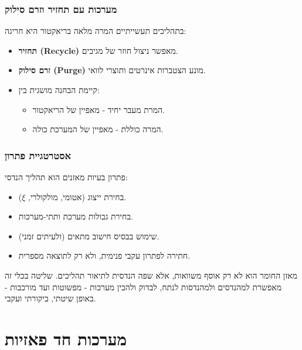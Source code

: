 \documentclass[
  hebrew,
  letterpaper,
  DIV=11,
  numbers=noendperiod]{scrreprt}
\providecommand{\tightlist}{%
  \setlength{\itemsep}{0pt}\setlength{\parskip}{0pt}}
\begin{document}
\subsection{מערכות עם תחזיר וזרם
סילוק}\label{ux5deux5e2ux5e8ux5dbux5d5ux5ea-ux5e2ux5dd-ux5eaux5d7ux5d6ux5d9ux5e8-ux5d5ux5d6ux5e8ux5dd-ux5e1ux5d9ux5dcux5d5ux5e7}

בתהליכים תעשייתיים המרה מלאה בריאקטור היא חריגה:

\begin{itemize}
\tightlist
\item
  \textbf{תחזיר (Recycle)} מאפשר ניצול חוזר של מגיבים.
\item
  \textbf{זרם סילוק (Purge)} מונע הצטברות אינרטים ותוצרי לוואי.
\item
  קיימת הבחנה מושגית בין:

  \begin{itemize}
  \tightlist
  \item
    המרת מעבר יחיד - מאפיין של הריאקטור.
  \item
    המרה כוללת - מאפיין של המערכת כולה.
  \end{itemize}
\end{itemize}

\subsection{אסטרטגיית
פתרון}\label{ux5d0ux5e1ux5d8ux5e8ux5d8ux5d2ux5d9ux5d9ux5ea-ux5e4ux5eaux5e8ux5d5ux5df}

פתרון בעיות מאזנים הוא תהליך הנדסי:

\begin{itemize}
\tightlist
\item
  בחירת ייצוג (אטומי, מולקולרי, \(\xi\)).
\item
  בחירת גבולות מערכת ותתי-מערכות.
\item
  שימוש בבסיס חישוב מתאים (ולעיתים זמני).
\item
  חתירה לפתרון עקבי פנימית, ולא רק לתוצאה מספרית.
\end{itemize}

מאזן החומר הוא לא רק אוסף משוואות, אלא שפה הנדסית לתיאור תהליכים. שליטה
בכלי זה מאפשרת למהנדסים ולמהנדסות לנתח, לבדוק ולהבין מערכות - מפשוטות
ועד מורכבות - באופן שיטתי, ביקורתי ועקבי.


\chapter{מערכות חד
פאזיות}\label{ux5deux5e2ux5e8ux5dbux5d5ux5ea-ux5d7ux5d3-ux5e4ux5d0ux5d6ux5d9ux5d5ux5ea}
\end{document}
